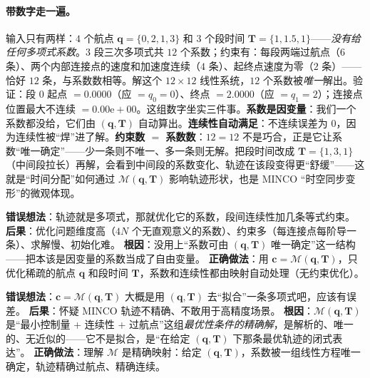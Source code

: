 \paragraph{带数字走一遍。}
输入只有两样：$4$ 个航点 $\mathbf q=\{0,2,1,3\}$ 和 $3$ 个段时间 $\mathbf T=\{1,1.5,1\}$——\emph{没有给任何多项式系数}。$3$ 段三次多项式共 $12$ 个系数；约束有：每段两端过航点（$6$ 条）、两个内部连接点的速度和加速度连续（$4$ 条）、起终点速度为零（$2$ 条）——恰好 $12$ 条，与系数数相等。解这个 $12\times 12$ 线性系统，$12$ 个系数被\emph{唯一}解出。验证：段 $0$ 起点 $=0.0000$（应 $=q_0=0$）、终点 $=2.0000$（应 $=q_1=2$）；连接点位置最大不连续 $=0.00\mathrm{e}{+}00$。这组数字坐实三件事。\textbf{系数是因变量}：我们一个系数都没给，它们由 $(\mathbf q,\mathbf T)$ 自动算出。\textbf{连续性自动满足}：不连续误差为 $0$，因为连续性被“焊”进了解。\textbf{约束数 $=$ 系数数}：$12=12$ 不是巧合，正是它让系数“唯一确定”——少一条则不唯一、多一条则无解。把段时间改成 $\mathbf T=\{1,3,1\}$（中间段拉长）再解，会看到中间段的系数变化、轨迹在该段变得更“舒缓”——这就是“时间分配”如何通过 $\mathcal M(\mathbf q,\mathbf T)$ 影响轨迹形状，也是 MINCO “时空同步变形”的微观体现。

\begin{pitfall}
\textbf{错误想法}：轨迹就是多项式，那就优化它的系数，段间连续性加几条等式约束。\;
\textbf{后果}：优化问题维度高（$4N$ 个无直观意义的系数）、约束多（每连接点每阶导一条）、求解慢、初始化难。\;
\textbf{根因}：没用上“系数可由 $(\mathbf q,\mathbf T)$ 唯一确定”这一结构——把本该是因变量的系数当成了自由变量。\;
\textbf{正确做法}：用 $\mathbf c=\mathcal M(\mathbf q,\mathbf T)$，只优化稀疏的航点 $\mathbf q$ 和段时间 $\mathbf T$，系数和连续性都由映射自动处理（无约束优化）。
\end{pitfall}

\begin{pitfall}
\textbf{错误想法}：$\mathbf c=\mathcal M(\mathbf q,\mathbf T)$ 大概是用 $(\mathbf q,\mathbf T)$ 去“拟合”一条多项式吧，应该有误差。\;
\textbf{后果}：怀疑 MINCO 轨迹不精确、不敢用于高精度场景。\;
\textbf{根因}：$\mathcal M(\mathbf q,\mathbf T)$ 是“最小控制量 + 连续性 + 过航点”这组\emph{最优性条件的精确解}，是解析的、唯一的、无近似的——它不是拟合，是“在给定 $(\mathbf q,\mathbf T)$ 下那条最优轨迹的闭式表达”。\;
\textbf{正确做法}：理解 $\mathcal M$ 是精确映射：给定 $(\mathbf q,\mathbf T)$，系数被一组线性方程唯一确定，轨迹精确过航点、精确连续。
\end{pitfall}

